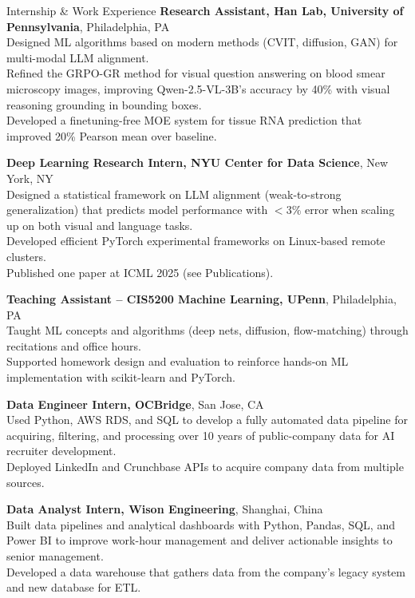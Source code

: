 \begin{rubric}{Internship \& Work Experience}
%
	\textbf{Research Assistant, Han Lab, University of Pennsylvania}, Philadelphia, PA\\
	Designed ML algorithms based on modern methods (CVIT, diffusion, GAN) for multi-modal LLM alignment.\\
	Refined the GRPO-GR method for visual question answering on blood smear microscopy images, improving Qwen-2.5-VL-3B's accuracy by 40\% with visual reasoning grounding in bounding boxes.\\
	Developed a finetuning-free MOE system for tissue RNA prediction that improved 20\% Pearson mean over baseline.

%
	\textbf{Deep Learning Research Intern, NYU Center for Data Science}, New York, NY\\
	Designed a statistical framework on LLM alignment (weak-to-strong generalization) that predicts model performance with $<3\%$ error when scaling up on both visual and language tasks.\\
	Developed efficient PyTorch experimental frameworks on Linux-based remote clusters.\\
	Published one paper at ICML 2025 (see Publications).

%
	\textbf{Teaching Assistant -- CIS5200 Machine Learning, UPenn}, Philadelphia, PA\\
	Taught ML concepts and algorithms (deep nets, diffusion, flow-matching) through recitations and office hours.\\
	Supported homework design and evaluation to reinforce hands-on ML implementation with scikit-learn and PyTorch.

%
	\textbf{Data Engineer Intern, OCBridge}, San Jose, CA\\
	Used Python, AWS RDS, and SQL to develop a fully automated data pipeline for acquiring, filtering, and processing over 10 years of public-company data for AI recruiter development.\\
	Deployed LinkedIn and Crunchbase APIs to acquire company data from multiple sources.

%
	\textbf{Data Analyst Intern, Wison Engineering}, Shanghai, China\\
	Built data pipelines and analytical dashboards with Python, Pandas, SQL, and Power BI to improve work-hour management and deliver actionable insights to senior management.\\
	Developed a data warehouse that gathers data from the company's legacy system and new database for ETL.
\end{rubric}
